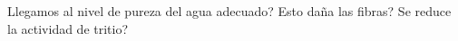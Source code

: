 Llegamos al nivel de pureza del agua adecuado? Esto daña las fibras? Se reduce la actividad de tritio? 